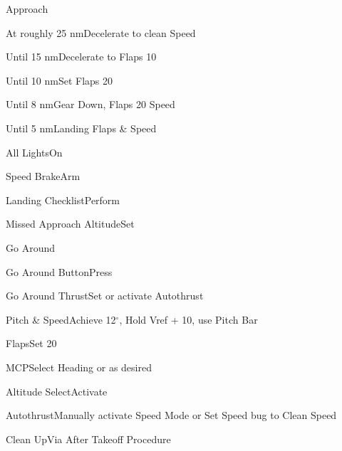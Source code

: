 \documentclass[sim-use]{checklist}
\begin{document}
\begin{checklist}{Approach}
	\item{At roughly 25 nm}{Decelerate to clean Speed}
	\item{Until 15 nm}{Decelerate to Flaps 10}
	\item{Until 10 nm}{Set Flaps 20}
	\item{Until 8 nm}{Gear Down, Flaps 20 Speed}
	\item{Until 5 nm}{Landing Flaps \& Speed}
	\item{All Lights}{On}
	\item{Speed Brake}{Arm}
	\item{Landing Checklist}{Perform}
	 {
		\item{Missed Approach Altitude}{Set}
	}
\end{checklist}

\begin{checklist}{Go Around}
	\item{Go Around Button}{Press}
	\item{Go Around Thrust}{Set or activate Autothrust}
	\item{Pitch \& Speed}{Achieve 12$^\circ$, Hold Vref + 10, use Pitch Bar}
	\item{Flaps}{Set 20}
\end{checklist}

\begin{continuedchecklist}
	\item{MCP}{Select Heading or as desired}
	\item{Altitude Select}{Activate}
	\item{Autothrust}{Manually activate Speed Mode or Set Speed bug to Clean Speed}
	\item{Clean Up}{Via After Takeoff Procedure}
\end{continuedchecklist}
\end{document}

